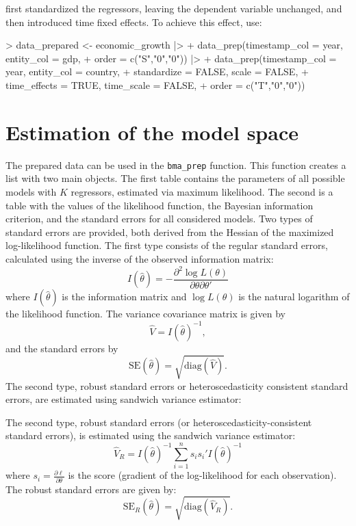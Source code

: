\documentclass[a4paper]{article}
\begin{document}
\citet{Moral+2016} first standardized the regressors, leaving the dependent variable unchanged, and then introduced time fixed effects.
To achieve this effect, use:
\begin{Schunk}
\begin{Sinput}
> data_prepared <- economic_growth |>
+     data_prep(timestamp_col = year, entity_col = gdp,
+               order = c("S","0","0")) |>
+     data_prep(timestamp_col = year, entity_col = country,
+               standardize = FALSE, scale = FALSE,
+               time_effects = TRUE, time_scale = FALSE,
+               order = c("T","0","0"))
\end{Sinput}
\end{Schunk}

\section{Estimation of the model space}\label{model_space}
The prepared data can be used in the \verb+bma_prep+ function.
This function creates a list with two main objects.
The first table contains the parameters of all possible models with $K$ regressors, estimated via maximum likelihood.
The second is a table with the values of the likelihood function, the Bayesian information criterion, and the standard errors for all considered models.
Two types of standard errors are provided, both derived from the Hessian of the maximized log-likelihood function.
The first type consists of the regular standard errors, calculated using the inverse of the observed information matrix:
\begin{equation}
I(\hat{\theta}) = -\frac{\partial^2 \log L(\theta)}{\partial \theta \partial \theta'}
\end{equation}
where $I(\hat{\theta})$ is the information matrix and $\log L(\theta)$ is the natural logarithm of the likelihood function.
The variance covariance matrix is given by
\begin{equation}
\hat{V} = I(\hat{\theta})^{-1},
\end{equation}
and the standard errors by
\begin{equation}
\text{SE}(\hat{\theta}) = \sqrt{\text{diag}(\hat{V})}.
\end{equation}
The second type, robust standard errors or heteroscedasticity consistent standard errors, are estimated using sandwich variance estimator:

The second type, robust standard errors (or heteroscedasticity-consistent standard errors), is estimated using the sandwich variance estimator:
\begin{equation}
\hat{V}_{R} = I(\hat{\theta})^{-1} \sum_{i=1}^{n} s_i s_i' I(\hat{\theta})^{-1}
\end{equation}
where $s_i = \frac{\partial \ell}{\partial \theta}$ is the score (gradient of the log-likelihood for each observation).
The robust standard errors are given by:
\begin{equation}
\text{SE}_{R}(\hat{\theta}) = \sqrt{\text{diag}(\hat{V}_{R})}.
\end{equation}
\end{document}

